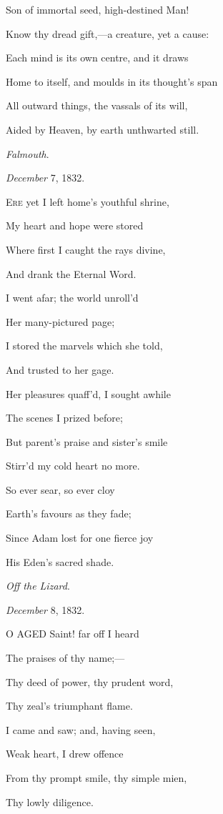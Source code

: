 Son of immortal seed, high-destined Man!

Know thy dread gift,—a creature, yet a cause:

Each mind is its own centre, and it draws

Home to itself, and moulds in its thought's span

All outward things, the vassals of its will,

Aided by Heaven, by earth unthwarted still.

\emph{Falmouth}.

\emph{December} 7, 1832.


E\textsc{re} yet I left home's youthful shrine,

My heart and hope were stored

Where first I caught the rays divine,

And drank the Eternal Word.

I went afar; the world unroll'd

Her many-pictured page;

I stored the marvels which she told,

And trusted to her gage.

Her pleasures quaff'd, I sought awhile

The scenes I prized before;

But parent's praise and sister's smile

Stirr'd my cold heart no more. 

So ever sear, so ever cloy

Earth's favours as they fade;

Since Adam lost for one fierce joy

His Eden's sacred shade.

\emph{Off the Lizard}.

\emph{December} 8, 1832.


O AGED Saint! far off I heard

The praises of thy name;—

Thy deed of power, thy prudent word,

Thy zeal's triumphant flame.

I came and saw; and, having seen,

Weak heart, I drew offence

From thy prompt smile, thy simple mien,

Thy lowly diligence.

